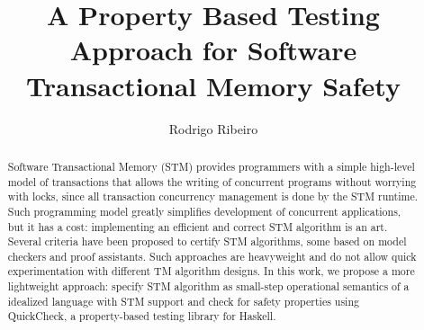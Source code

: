 \documentclass[sigplan, anonymous, review]{acmart}
\theoremstyle{definition}
\begin{document}
\title{A Property Based Testing Approach for Software Transactional Memory Safety}

\author{Rodrigo Ribeiro}

\begin{abstract}
Software Transactional Memory (STM) provides programmers with a simple high-level model of transactions that allows the
writing of concurrent programs without worrying with locks, since all transaction concurrency management is done by
the STM runtime. Such programming model greatly simplifies development of concurrent applications, but it has a cost:
implementing an efficient and correct STM algorithm is an art. Several criteria have been proposed to certify
STM algorithms, some based on model checkers and proof assistants. Such approaches are heavyweight and
do not allow quick experimentation with different TM algorithm designs. In this work, we propose a more
lightweight approach: specify STM algorithm as small-step operational semantics of a idealized language with
STM support and check for safety properties using QuickCheck, a property-based testing library for Haskell.
\end{abstract}
\end{document}

